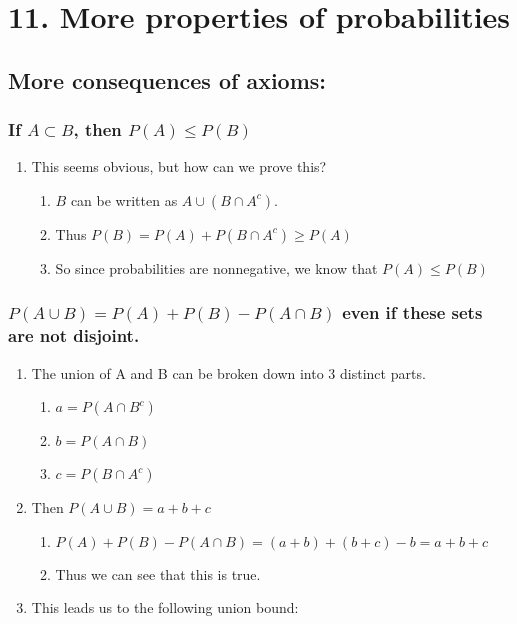 \documentclass[11pt]{article}
\begin{document}
\section{11. More properties of probabilities}
\label{sec:org69aa9c4}
\subsection{More consequences of axioms:}
\label{sec:org62f89cb}
\subsubsection{If \(A \subset B\), then \(P(A)\le P(B)\)}
\label{sec:orgba2532a}
\begin{enumerate}
\item This seems obvious, but how can we prove this?
\label{sec:org3a4ee23}
\begin{enumerate}
\item \(B\) can be written as \(A \cup (B \cap A^c)\).
\label{sec:org64c3819}
\item Thus \(P(B)=P(A) +P(B \cap A^c)\ge P(A)\)
\label{sec:org4af2d45}
\item So since probabilities are nonnegative, we know that \(P(A) \le P(B)\)
\label{sec:orgfba0c1e}
\end{enumerate}
\end{enumerate}
\subsubsection{\(P(A \cup B) = P(A) + P(B) -P(A \cap B)\) even if these sets are not disjoint.}
\label{sec:orgde3017a}
\begin{enumerate}
\item The union of A and B can be broken down into 3 distinct parts.
\label{sec:org398c7fc}
\begin{enumerate}
\item \(a=P(A \cap B^c)\)
\label{sec:org5e3026f}
\item \(b=P(A \cap B)\)
\label{sec:org8ef05bb}
\item \(c=P(B  \cap A^c)\)
\label{sec:org142ed77}
\end{enumerate}
\item Then \(P(A \cup B) =a+b+c\)
\label{sec:org16bcbdc}
\begin{enumerate}
\item \(P(A)+P(B)-P(A\cap B)=(a+b)+(b+c)-b=a+b+c\)
\label{sec:org72dacf5}
\item Thus we can see that this is true.
\label{sec:orga903ba9}
\end{enumerate}
\item This leads us to the following union bound:
\label{sec:org4e7fe52}
\end{enumerate}
\end{document}
